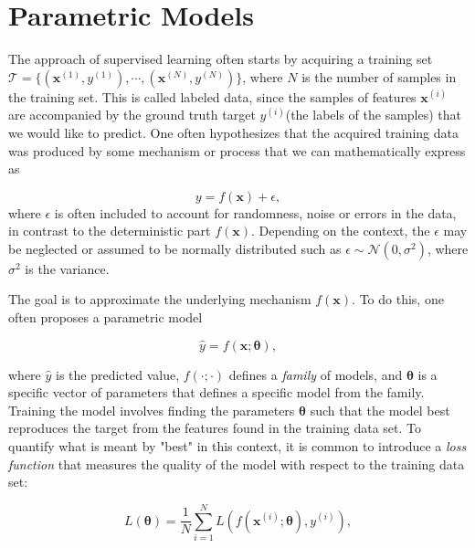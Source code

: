 \section{Parametric Models}\label{sec:ParametricModels}
The approach of supervised learning often starts by acquiring a training set $\mathcal{T} = \{(\boldsymbol{x}^{(1)}, y^{(1)}), \cdots, (\boldsymbol{x}^{(N)}, y^{(N)})\}$, where $N$ is the number of samples in the training set. This is called labeled data, since the samples of features $\boldsymbol{x}^{(i)}$ are accompanied by the ground truth target $y^{(i)}$(the labels of the samples) that we would like to predict. One often hypothesizes that the acquired training data was produced by some mechanism or process that we can mathematically express as

\begin{equation}\label{eq:data}
    y = f(\boldsymbol{x}) + \epsilon,
\end{equation}
where $\epsilon$ is often included to account for randomness, noise or errors in the data, in contrast to the deterministic part $f(\boldsymbol{x})$. Depending on the context, the $\epsilon$ may be neglected or assumed to be normally distributed such as $\epsilon \sim \mathcal{N}(0, \sigma^2)$, where $\sigma^2$ is the variance.

The goal is to approximate the underlying mechanism $f(\boldsymbol{x})$. To do this, one often proposes a parametric model

\begin{equation*}
    \hat{y} = f(\boldsymbol{x}; \boldsymbol{\theta}),
\end{equation*}

where $\hat{y}$ is the predicted value, $f(\cdot; \cdot)$ defines a \emph{family} of models, and $\boldsymbol{\theta}$ is a specific vector of parameters that defines a specific model from the family. Training the model involves finding the parameters $\boldsymbol{\theta}$ such that the model best reproduces the target from the features found in the training data set. To quantify what is meant by "best" in this context, it is common to introduce a \emph{loss function} that measures the quality of the model with respect to the training data set:

\begin{equation}\label{eq:LossFunction}
    L(\boldsymbol{\theta}) = \frac{1}{N}\sum_{i=1}^{N} L(f(\boldsymbol{x}^{(i)}; \boldsymbol{\theta}) , y^{(i)}),
\end{equation}

